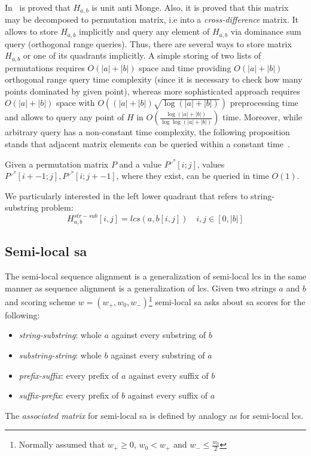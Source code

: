 In~\cite{tiskin} is proved that $H_{a,b}$ is unit anti Monge.
Also, it is proved that this matrix may be decomposed to permutation matrix, i.e into a \emph{cross-difference} matrix.
It allows to store $H_{a,b}$ implicitly and query any element of $H_{a,b}$ via dominance sum query (orthogonal range queries).
Thus, there are several ways to store matrix $H_{a,b}$ or one of its quadrants implicitly.
A simple storing of two lists of permutations requires $O(|a|+|b|)$ space and time providing $O(|a|+|b|)$ orthogonal range query time complexity (since it is necessary to check how many points dominated by given point), whereas more sophisticated approach requires $O(|a|+|b|)$ space with $O( (|a|+|b|) \sqrt{\log{ (|a| +|b|)} } )$ preprocessing time and allows to query any point of $H$ in $O(\frac{\log (|a|+|b|)}{\log \log (|a|+|b|)})$ time.  
Moreover, while arbitrary query has a non-constant time complexity, the following proposition stands that adjacent matrix elements can be queried within a constant time~\cite{.}.
\begin{proposition}
  Given a permutation matrix $P$ and a value $P^{\nearrow}[i; j]$,
  values $P^{\nearrow}[i +- 1; j], P^{\nearrow}[i; j +- 1]$, where they exist,
  can be queried in time $O(1)$.
\end{proposition}

We particularly interested in the left lower quadrant that refers to string-substring problem:
\begin{equation}
H_{a,b}^{str-sub}[i,j] = lcs(a,b[i,j]) \quad i,j \in [0,|b|] 
\end{equation}

\subsection{Semi-local sa}
The semi-local sequence alignment is a generalization of semi-local lcs in the same manner as sequence alignment is a generalization of lcs.
Given two strings $a$ and $b$ and scoring scheme $w=(w_{+},w_{0},w_{-})$\footnote{Normally assumed that $w_{+}\geq 0$, $w_{0} < w_{+}$ and $w_{-}\leq \frac{w_{0}}{2}$}  semi-local sa asks about sa scores for the following:
\begin{itemize}
\item \emph{string-substring}: whole $a$ against every substring of $b$
\item \emph{substring-string}: whole $b$ against every substring of $a$
\item \emph{prefix-suffix}: every prefix of $a$ against every suffix of $b$
\item \emph{suffix-prefix}: every prefix of $b$ against every suffix of $a$
\end{itemize} 
The \emph{associated matrix} for semi-local sa is defined by analogy as for semi-local lcs.

